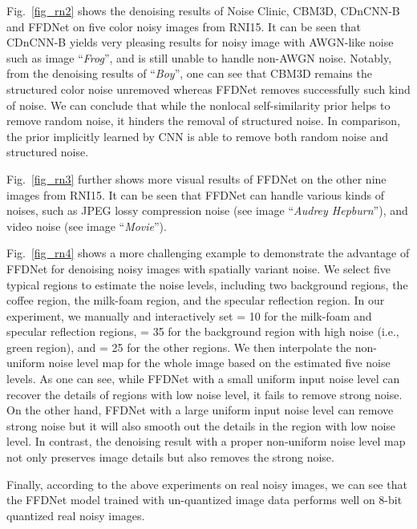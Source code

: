 \documentclass[journal]{IEEEtran}
\begin{document}
Fig.~\ref{fig_rn2} shows the denoising results of Noise Clinic, CBM3D, {CDnCNN-B} and FFDNet on five color noisy images from RNI15.
It can be seen that CDnCNN-B yields very pleasing results for noisy image with AWGN-like noise such as image ``\emph{Frog}'', and is still unable to handle non-AWGN noise.
Notably, from the denoising results of ``\emph{Boy}'', one can see that CBM3D remains the structured color noise unremoved whereas FFDNet removes successfully such kind of noise. We can conclude that while the nonlocal self-similarity prior helps to remove random noise, it hinders the removal of structured noise. In comparison, the prior implicitly learned by CNN is able to remove both random noise and structured noise.



Fig.~\ref{fig_rn3} further shows more visual results of FFDNet on the other nine images from RNI15. It can be seen that  FFDNet can handle various kinds of noises, such as JPEG lossy compression noise (see image ``\emph{Audrey Hepburn}''), and video noise (see image ``\emph{Movie}'').



Fig.~\ref{fig_rn4} shows a more challenging example to demonstrate the advantage of FFDNet for denoising noisy images with spatially variant noise.
We select five typical regions to estimate the noise levels, including two background regions, the coffee region, the milk-foam region, and the specular reflection region. In our experiment, we manually and interactively set  = 10 for the milk-foam and specular reflection regions,  = 35 for the background region with high noise (i.e., green region), and  = 25 for the other regions. We then interpolate the non-uniform noise level map for the whole image based on the estimated five noise levels.
As one can see, while FFDNet with a small uniform input noise level can recover the details of regions with low noise level, it fails to remove strong noise. On the other hand, FFDNet with a large uniform input noise level can remove strong noise but it will also smooth out the details in the region with low noise level. In contrast, the denoising result with a proper non-uniform noise level map not only preserves image details but also removes the strong noise.

Finally, according to the above experiments on real noisy images, we can see that the FFDNet model trained with un-quantized image data performs well on 8-bit quantized real noisy images.
\end{document}
